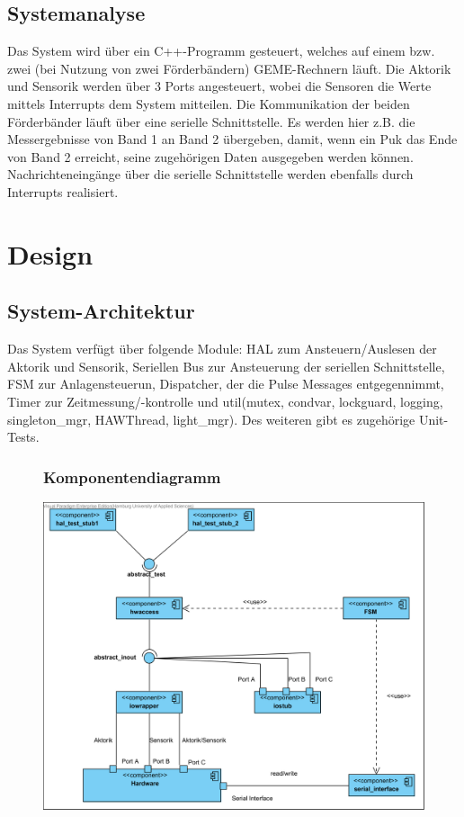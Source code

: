 \documentclass[oneside,a4paper,titlepage]{scrartcl} %
\begin{document}
\newpage

\subsection{Systemanalyse}
Das System wird über ein C++-Programm gesteuert, welches auf einem bzw. zwei (bei Nutzung von zwei Förderbändern) GEME-Rechnern läuft. Die Aktorik und Sensorik werden über 3 Ports angesteuert, wobei die Sensoren die Werte mittels Interrupts dem System mitteilen.\newline
Die Kommunikation der beiden Förderbänder läuft über eine serielle Schnittstelle. Es werden hier z.B. die Messergebnisse von Band 1 an Band 2 übergeben, damit, wenn ein Puk das Ende von Band 2 erreicht, seine zugehörigen Daten ausgegeben werden können. Nachrichteneingänge über die serielle Schnittstelle werden ebenfalls durch Interrupts realisiert.\newline
\newpage

\section{Design}

\subsection{System-Architektur}
Das System verfügt über folgende Module: HAL zum Ansteuern/Auslesen der Aktorik und Sensorik, Seriellen Bus zur Ansteuerung der seriellen Schnittstelle, FSM zur Anlagensteuerun, Dispatcher, der die Pulse Messages entgegennimmt, Timer zur Zeitmessung/-kontrolle und util(mutex, condvar, lockguard, logging, singleton\_mgr, HAWThread, light\_mgr). Des weiteren gibt es zugehörige Unit-Tests.\newpage

\begin{figure}
    \subsubsection{Komponentendiagramm}
    \centering\vfill\includegraphics[angle=0,scale=0.8]{imgs/Sortieranlage-Komponenten.png}
    \newline
\end{figure}
\end{document}
